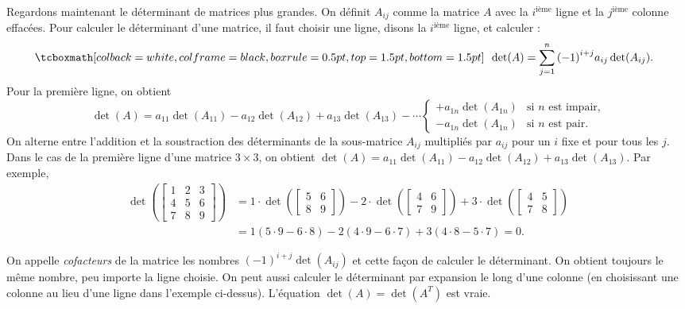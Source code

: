 Regardons maintenant le déterminant de matrices plus grandes. On définit $A_{ij}$ comme la matrice $A$ avec la $i^{\text{ième}}$ ligne et la $j^{\text{ième}}$ colonne effacées. Pour calculer le déterminant d'une matrice, il faut choisir une ligne, disons la
$i^{\text{ième}}$ ligne, et calculer :
\begin{equation*}
\mybxbg{~~
\det (A) =
\sum_{j=1}^n
{(-1)}^{i+j}
a_{ij} \det (A_{ij}) .
~~}
\end{equation*}
Pour la première ligne, on obtient
\begin{equation*}
\det (A) =
a_{11} \det (A_{11}) - 
a_{12} \det (A_{12}) + 
a_{13} \det (A_{13}) - 
\cdots
\begin{cases}
+ a_{1n} \det (A_{1n}) & \text{si } n \text{ est impair,} \\
- a_{1n} \det (A_{1n}) & \text{si } n \text{ est pair.}
\end{cases}
\end{equation*}
On alterne entre l'addition et la soustraction des déterminants de la sous-matrice 
$A_{ij}$ multipliés par $a_{ij}$ pour un $i$ fixe et pour tous les $j$.
Dans le cas de la première ligne d'une matrice $3 \times 3$,
on obtient $\det (A) = a_{11} \det (A_{11}) -
a_{12} \det (A_{12}) + a_{13} \det (A_{13})$. Par exemple,
\begin{equation*}
\begin{split}
\det \left(
\begin{bmatrix}
1 & 2 & 3 \\
4 & 5 & 6 \\
7 & 8 & 9
\end{bmatrix}
\right)
& =
1 \cdot
\det \left(
\begin{bmatrix}
5 & 6 \\
8 & 9
\end{bmatrix}
\right)
-
2 \cdot
\det \left(
\begin{bmatrix}
4 & 6 \\
7 & 9
\end{bmatrix}
\right)
+
3 \cdot
\det \left(
\begin{bmatrix}
4 & 5 \\
7 & 8
\end{bmatrix}
\right) \\
& =
1 (5 \cdot 9 - 6 \cdot 8)
-
2 (4 \cdot 9 - 6 \cdot 7)
+
3 (4 \cdot 8 - 5 \cdot 7)
= 0 .
\end{split}
\end{equation*}

On appelle \emph{cofacteurs} de la matrice les nombres ${(-1)}^{i+j}\det(A_{ij})$ et
\emph{} cette façon de calculer le déterminant.
On obtient toujours le même nombre, peu importe la ligne choisie. On peut aussi calculer le déterminant par expansion le long d'une colonne (en choisissant une colonne au lieu d'une ligne dans l'exemple ci-dessus). L'équation $\det(A) = \det(A^T)$ est vraie.

